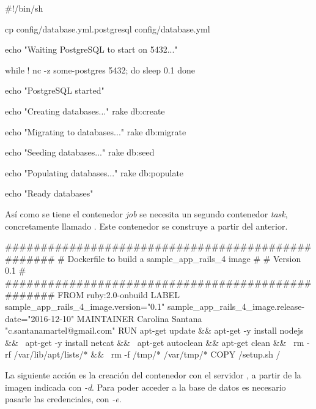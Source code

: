 \begin{codelisting}
\label{code:dockerfile}
\begin{code}
#!/bin/sh

cp config/database.yml.postgresql config/database.yml

echo "Waiting PostgreSQL to start on 5432..."

while ! nc -z some-postgres 5432; do
  sleep 0.1
done

echo "PostgreSQL started"

echo "Creating databases..."
rake db:create

echo "Migrating to databases..."
rake db:migrate

echo "Seeding databases..."
rake db:seed

echo "Populating databases..."
rake db:populate

echo "Ready databases"

\end{code}
\end{codelisting}

Así como se tiene el contenedor \textit{job} se necesita un segundo contenedor \textit{task}, concretamente llamado . Este contenedor se construye a partir del anterior.

\begin{codelisting}
\label{code:dockerfile}
\begin{code}
##################################################
# Dockerfile to build a sample_app_rails_4 image #
# Version 0.1                                    #
##################################################
FROM ruby:2.0-onbuild
LABEL sample_app_rails_4_image.version="0.1" 
      sample_app_rails_4_image.release-date="2016-12-10"
MAINTAINER Carolina Santana "c.santanamartel@gmail.com"
RUN apt-get update && apt-get -y install nodejs && \
    apt-get -y install netcat && \
    apt-get autoclean && apt-get clean && \
    rm -rf /var/lib/apt/lists/* && \
    rm -f /tmp/* /var/tmp/*
COPY /setup.sh /
\end{code}
\end{codelisting}

La siguiente acción es la creación del contenedor  con el servidor , a partir de la imagen  indicada con \textit{\--d}. Para poder acceder a la base de datos es necesario pasarle las credenciales, con \textit{\--e}. 

